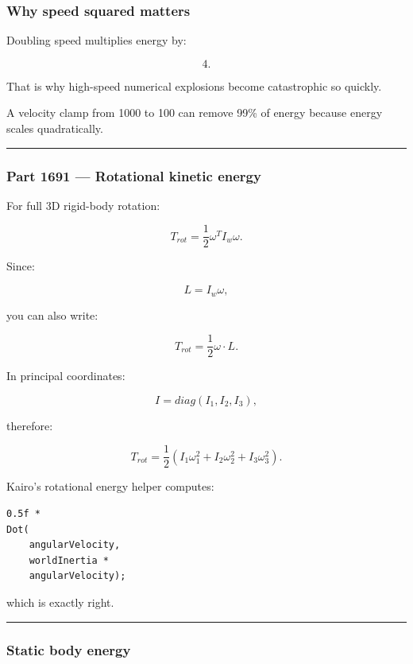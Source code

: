 \subsubsection{Why speed squared matters}\label{why-speed-squared-matters}

Doubling speed multiplies energy by:

\[
4.
\]

That is why high-speed numerical explosions become catastrophic so quickly.

A velocity clamp from 1000 to 100 can remove 99\% of energy because energy scales quadratically.

\begin{center}\rule{0.5\linewidth}{0.5pt}\end{center}

\subsubsection{Part 1691 --- Rotational kinetic energy}\label{part-1691-rotational-kinetic-energy}

For full 3D rigid-body rotation:

\[
\boxed{
T_{rot}
=
\frac12
\omega^T
I_w
\omega.
}
\]

Since:

\[
L=I_w\omega,
\]

you can also write:

\[
\boxed{
T_{rot}
=
\frac12
\omega\cdot L.
}
\]

In principal coordinates:

\[
I=
diag(I_1,I_2,I_3),
\]

therefore:

\[
T_{rot}
=
\frac12
(
I_1\omega_1^2+
I_2\omega_2^2+
I_3\omega_3^2
).
\]

Kairo's rotational energy helper computes:

\begin{verbatim}
0.5f *
Dot(
    angularVelocity,
    worldInertia *
    angularVelocity);
\end{verbatim}

which is exactly right.

\begin{center}\rule{0.5\linewidth}{0.5pt}\end{center}

\subsubsection{Static body energy}\label{static-body-energy}

